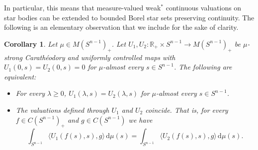 \documentclass[11pt, a4paper]{amsart}
\newtheorem{corollary}[proposition]{Corollary}
\renewcommand{\d}{\,\mathrm{d}}
\newcommand{\sn}{{S^{n-1}}}
\renewcommand{\d}{\,\mathrm{d}}
\begin{document}
In particular, this means that measure-valued weak$^*$ continuous valuations on star bodies can be extended to bounded Borel star sets preserving continuity. The following is an elementary observation that we include for the sake of clarity.

\begin{corollary}\label{co:uniqueness} 
Let $\mu\in M(\sn)_{\scriptscriptstyle +}$. Let $U_1,U_2:\mathbb{R}_{\scriptscriptstyle +}\times \sn\to M(\sn)_{\scriptscriptstyle +}$ be $\mu$-strong Carath\'eodory and uniformly controlled maps with $U_1(0,s)=U_2(0,s)=0$ for $\mu$-almost every $s\in\sn$. The following are equivalent: 
\begin{itemize}
    \item For every $\lambda\geq 0$, $U_1(\lambda,s)=U_2(\lambda,s)$ for $\mu$-almost every $s\in\sn$.
    \item The valuations defined through $U_1$ and $U_2$ coincide. That is, for every $f\in C(\sn)_{\scriptscriptstyle +}$ and $g\in C(\sn)$ we have
    \[
        \int_\sn \langle U_1(f(s),s),g\rangle\d \mu(s)=\int_\sn \langle U_2(f(s),s),g\rangle \d \mu(s).
    \]    
\end{itemize}
\end{corollary}
\end{document}
